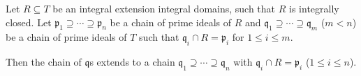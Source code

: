 Let $R \subseteq T$ be an integral extension integral domains,
such that $R$ is integrally closed.
Let $\mathfrak{p}_1\supseteq \cdots \supseteq \mathfrak{p}_n$ be a chain
of prime ideals of $R$ and $\mathfrak{q}_1 \supseteq \cdots \supseteq \mathfrak{q}_m$
($m < n$) be a chain of prime ideals of $T$ such that $\mathfrak{q}_i\cap R = \mathfrak{p}_i$
for $1\leq i\leq m$.

Then the chain of $\mathfrak{q}$s extends to a chain $\mathfrak{q}_1\supseteq \cdots \supseteq \mathfrak{q}_n$
with $\mathfrak{q}_i\cap R = \mathfrak{p}_i$ ($1\leq i\leq n$).
